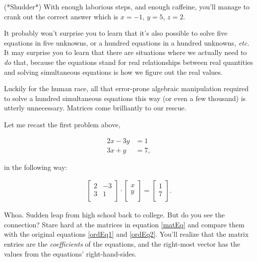 (*Shudder*) With enough laborious steps, and enough caffeine, you'll manage to
crank out the correct answer which is $x=-1$, $y=5$, $z=2$.

It probably won't surprise you to learn that it's also possible to solve five
equations in five unknowns, or a hundred equations in a hundred unknowns,
\textit{etc.} It may surprise you to learn that there are situations where we
actually need to \textit{do} that, because the equations stand for real
relationships between real quantities and solving simultaneous equations is how
we figure out the real values.

Luckily for the human race, all that error-prone algebraic manipulation
required to solve a hundred simultaneous equations this way (or even a few
thousand) is utterly unnecessary. Matrices come brilliantly to our rescue.

Let me recast the first problem above,

\vspace{-.25in}
\begin{align}
\label{ordEq1}
2x - 3y &= 1 \\
\label{ordEq2}
3x + y &= 7,
\end{align}
\vspace{-.25in}

in the following way:

\vspace{-.15in}
\begin{align}
\label{matEq}
\begin{bmatrix}
2 & -3 \\
3 & 1 \\
\end{bmatrix} \cdot
\begin{bmatrix}
x \\ y \\
\end{bmatrix} =
\begin{bmatrix}
1 \\ 7 \\
\end{bmatrix}.
\end{align}
\vspace{-.15in}

Whoa. Sudden leap from high school back to college. But do you see the
connection? Stare hard at the matrices in equation \ref{matEq} and compare them
with the original equations \ref{ordEq1} and \ref{ordEq2}. You'll realize that
the matrix entries are the \textit{coefficients} of the equations, and the
right-most vector has the values from the equations' right-hand-sides.


